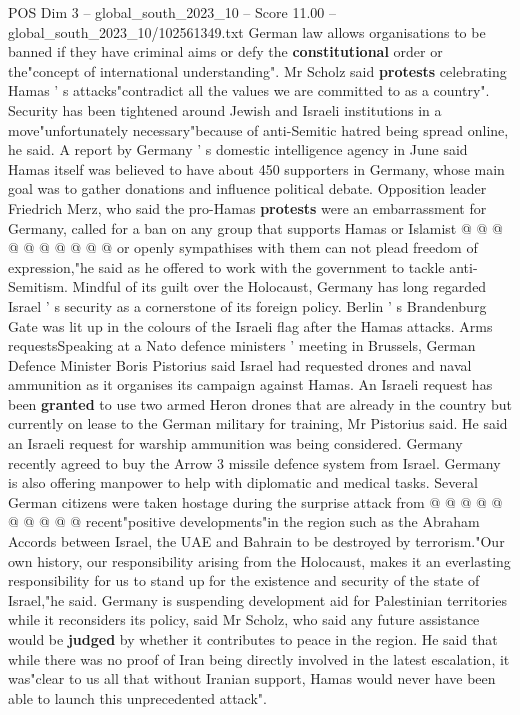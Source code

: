 \begin{textsample}{POS Dim 3 – global\_south\_2023\_10 – Score 11.00 – global\_south\_2023\_10/102561349.txt}
German law allows organisations to be banned if they have criminal aims or defy the \textbf{constitutional} order or the"concept of international understanding".
Mr Scholz said \textbf{protests} celebrating Hamas ' s attacks"contradict all the values we are committed to as a country".
Security has been tightened around Jewish and Israeli institutions in a move"unfortunately necessary"because of anti-Semitic hatred being spread online, he said.
A report by Germany ' s domestic intelligence agency in June said Hamas itself was believed to have about 450 supporters in Germany, whose main goal was to gather donations and influence political debate.
Opposition leader Friedrich Merz, who said the pro-Hamas \textbf{protests} were an embarrassment for Germany, called for a ban on any group that supports Hamas or Islamist @ @ @ @ @ @ @ @ @ @ or openly sympathises with them can not plead freedom of expression,"he said as he offered to work with the government to tackle anti-Semitism.
Mindful of its guilt over the Holocaust, Germany has long regarded Israel ' s security as a cornerstone of its foreign policy.
Berlin ' s Brandenburg Gate was lit up in the colours of the Israeli flag after the Hamas attacks.
Arms requestsSpeaking at a Nato defence ministers ' meeting in Brussels, German Defence Minister Boris Pistorius said Israel had requested drones and naval ammunition as it organises its campaign against Hamas.
An Israeli request has been \textbf{granted} to use two armed Heron drones that are already in the country but currently on lease to the German military for training, Mr Pistorius said.
He said an Israeli request for warship ammunition was being considered.
Germany recently agreed to buy the Arrow 3 missile defence system from Israel.
Germany is also offering manpower to help with diplomatic and medical tasks.
Several German citizens were taken hostage during the surprise attack from @ @ @ @ @ @ @ @ @ @ recent"positive developments"in the region such as the Abraham Accords between Israel, the UAE and Bahrain to be destroyed by terrorism."Our own history, our responsibility arising from the Holocaust, makes it an everlasting responsibility for us to stand up for the existence and security of the state of Israel,"he said.
Germany is suspending development aid for Palestinian territories while it reconsiders its policy, said Mr Scholz, who said any future assistance would be \textbf{judged} by whether it contributes to peace in the region.
He said that while there was no proof of Iran being directly involved in the latest escalation, it was"clear to us all that without Iranian support, Hamas would never have been able to launch this unprecedented attack".

\end{textsample}
